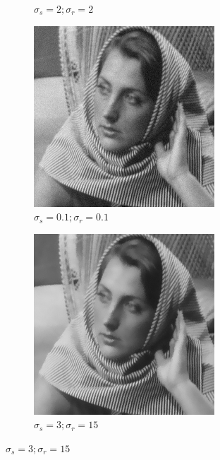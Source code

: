 \documentclass[12pt]{article}
\begin{document}
\begin{figure}[h]
\begin{subfigure}[b]{0.24\textwidth}
        \caption{$\sigma_s=2;\sigma_r=2$}
        \label{fig:subfig2}
    \end{subfigure}
    \begin{subfigure}[b]{0.24\textwidth}
        \centering
        \includegraphics[width=\textwidth]{../images/filtered_barbara_5_sigma_s_0.1_sigma_r_0.1.png}
        \caption{$\sigma_s=0.1;\sigma_r=0.1$}
        \label{fig:subfig3}
    \end{subfigure}
    \begin{subfigure}[b]{0.24\textwidth}
        \centering
        \includegraphics[width=\textwidth]{../images/filtered_barbara_5_sigma_s_3_sigma_r_15.png}
        \caption{$\sigma_s=3;\sigma_r=15$}
        \label{fig:subfig3}
    \end{subfigure}
    

\end{figure}
\end{document}
